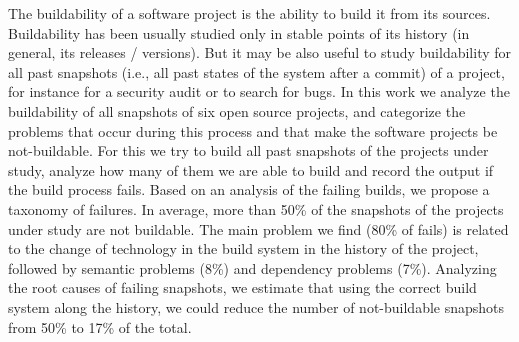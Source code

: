 The buildability of a software project is the ability to build it from its sources. 
Buildability has been usually studied only in stable points of its history (in general, its releases / versions).
But it may be also useful to study buildability for all past snapshots (i.e., all past states of the system after a commit) of a project, for instance for a security audit or to search for bugs.
In this work we analyze the buildability of all snapshots of six open source projects, and categorize the problems that occur during this process and that make the software projects be not-buildable.
For this we try to build all past snapshots of the projects under study, analyze how many of them we are able to build and record the output if the build process fails.
Based on an analysis of the failing builds, we propose a taxonomy of failures.
In average, more than 50\% of the snapshots of the projects under study are not buildable.
The main problem we find (80\% of fails) is related to the change of technology in the build system in the history of the project, followed by semantic problems (8\%) and dependency problems (7\%).
Analyzing the root causes of failing snapshots, we estimate that using the correct build system along the history, we could reduce the number of not-buildable snapshots from 50\% to 17\% of the total.

